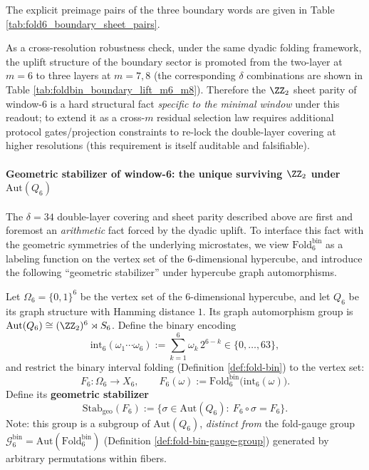 The explicit preimage pairs of the three boundary words are given in Table \ref{tab:fold6_boundary_sheet_pairs}.

As a cross-resolution robustness check, under the same dyadic folding framework, the uplift structure of the boundary sector is promoted from the two-layer at \(m=6\) to three layers at \(m=7,8\) (the corresponding \(\delta\) combinations are shown in Table \ref{tab:foldbin_boundary_lift_m6_m8}).
Therefore the \(\ZZ_2\) sheet parity of window-6 is a hard structural fact \emph{specific to the minimal window} under this readout; to extend it as a cross-\(m\) residual selection law requires additional protocol gates/projection constraints to re-lock the double-layer covering at higher resolutions (this requirement is itself auditable and falsifiable).


\paragraph{Geometric stabilizer of window-6: the unique surviving \texorpdfstring{$\ZZ_2$}{Z2} under \texorpdfstring{$\mathrm{Aut}(Q_6)$}{Aut(Q6)}}
The \(\delta=34\) double-layer covering and sheet parity described above are first and foremost an \emph{arithmetic} fact forced by the dyadic uplift.
To interface this fact with the geometric symmetries of the underlying microstates, we view \(\mathrm{Fold}^{\mathrm{bin}}_6\) as a labeling function on the vertex set of the \(6\)-dimensional hypercube, and introduce the following ``geometric stabilizer'' under hypercube graph automorphisms.\par
Let \(\Omega_6=\{0,1\}^6\) be the vertex set of the \(6\)-dimensional hypercube, and let \(Q_6\) be its graph structure with Hamming distance \(1\).
Its graph automorphism group is
\(
\mathrm{Aut}(Q_6)\cong (\ZZ_2)^6\rtimes S_6
\).
Define the binary encoding
\[
\mathrm{int}_6(\omega_1\cdots\omega_6):=\sum_{k=1}^6 \omega_k\,2^{6-k}\in\{0,\dots,63\},
\]
and restrict the binary interval folding (Definition \ref{def:fold-bin}) to the vertex set:
\[
F_6:\Omega_6\to X_6,\qquad F_6(\omega):=\mathrm{Fold}^{\mathrm{bin}}_6\bigl(\mathrm{int}_6(\omega)\bigr).
\]
Define its \textbf{geometric stabilizer}
\[
\mathrm{Stab}_{\mathrm{geo}}(F_6)
:=\bigl\{\sigma\in \mathrm{Aut}(Q_6):\ F_6\circ\sigma=F_6\bigr\}.
\]
Note: this group is a subgroup of \(\mathrm{Aut}(Q_6)\), \emph{distinct from} the fold-gauge group
\(\mathcal{G}^{\mathrm{bin}}_6=\mathrm{Aut}(\mathrm{Fold}^{\mathrm{bin}}_6)\) (Definition \ref{def:fold-bin-gauge-group}) generated by arbitrary permutations within fibers.\par

